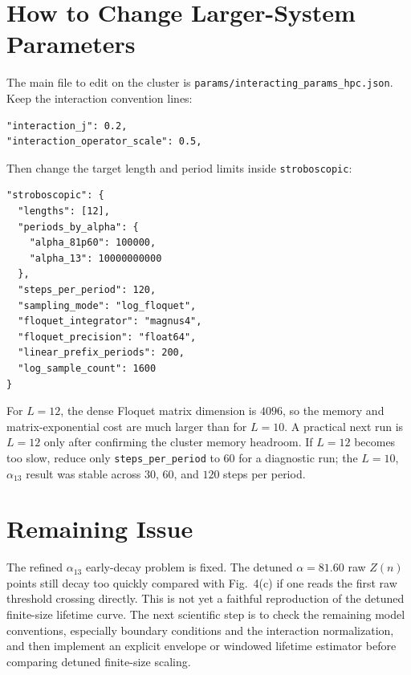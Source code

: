 \documentclass[11pt,a4paper]{article}
\begin{document}
\section{How to Change Larger-System Parameters}

The main file to edit on the cluster is \texttt{params/interacting\_params\_hpc.json}. Keep the interaction convention lines:
\begin{verbatim}
"interaction_j": 0.2,
"interaction_operator_scale": 0.5,
\end{verbatim}
Then change the target length and period limits inside \texttt{stroboscopic}:
\begin{verbatim}
"stroboscopic": {
  "lengths": [12],
  "periods_by_alpha": {
    "alpha_81p60": 100000,
    "alpha_13": 10000000000
  },
  "steps_per_period": 120,
  "sampling_mode": "log_floquet",
  "floquet_integrator": "magnus4",
  "floquet_precision": "float64",
  "linear_prefix_periods": 200,
  "log_sample_count": 1600
}
\end{verbatim}
For \(L=12\), the dense Floquet matrix dimension is \(4096\), so the memory and matrix-exponential cost are much larger than for \(L=10\). A practical next run is \(L=12\) only after confirming the cluster memory headroom. If \(L=12\) becomes too slow, reduce only \texttt{steps\_per\_period} to \(60\) for a diagnostic run; the \(L=10\), \(\alpha_{13}\) result was stable across \(30\), \(60\), and \(120\) steps per period.

\section{Remaining Issue}

The refined \(\alpha_{13}\) early-decay problem is fixed. The detuned \(\alpha=81.60\) raw \(Z(n)\) points still decay too quickly compared with Fig.~4(c) if one reads the first raw threshold crossing directly. This is not yet a faithful reproduction of the detuned finite-size lifetime curve. The next scientific step is to check the remaining model conventions, especially boundary conditions and the interaction normalization, and then implement an explicit envelope or windowed lifetime estimator before comparing detuned finite-size scaling.
\end{document}
